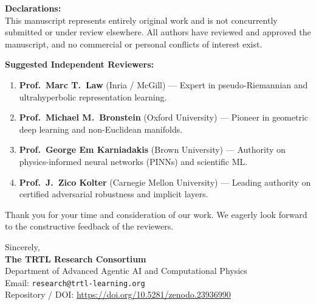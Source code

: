 \documentclass[11pt]{article}
\begin{document}
\vspace{0.2cm}
\noindent
\textbf{Declarations:} \\
This manuscript represents entirely original work and is not concurrently submitted or under review elsewhere. All authors have reviewed and approved the manuscript, and no commercial or personal conflicts of interest exist.

\vspace{0.4cm}
\noindent
\textbf{Suggested Independent Reviewers:}
\begin{enumerate}
    \item \textbf{Prof.~Marc T.~Law} (Inria / McGill) --- Expert in pseudo-Riemannian and ultrahyperbolic representation learning.
    \item \textbf{Prof.~Michael M.~Bronstein} (Oxford University) --- Pioneer in geometric deep learning and non-Euclidean manifolds.
    \item \textbf{Prof.~George Em Karniadakis} (Brown University) --- Authority on physics-informed neural networks (PINNs) and scientific ML.
    \item \textbf{Prof.~J.~Zico Kolter} (Carnegie Mellon University) --- Leading authority on certified adversarial robustness and implicit layers.
\end{enumerate}

\vspace{0.4cm}
\noindent
Thank you for your time and consideration of our work. We eagerly look forward to the constructive feedback of the reviewers.

\vspace{0.4cm}
\noindent
Sincerely, \\
\textbf{The TRTL Research Consortium} \\
Department of Advanced Agentic AI and Computational Physics \\
Email: \texttt{research@trtl-learning.org} \\
Repository / DOI: \url{https://doi.org/10.5281/zenodo.23936990}
\end{document}
